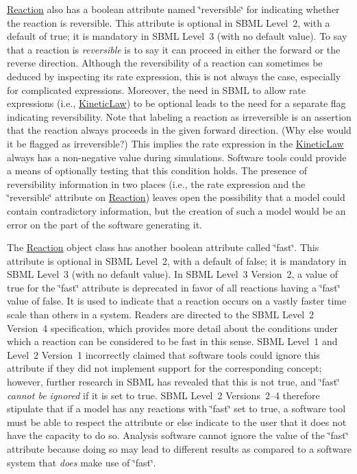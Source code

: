 \hyperlink{class_reaction}{Reaction} also has a boolean attribute named \char`\"{}reversible\char`\"{} for indicating whether the reaction is reversible. This attribute is optional in S\+B\+ML Level~2, with a default of {\ttfamily true}; it is mandatory in S\+B\+ML Level~3 (with no default value). To say that a reaction is {\itshape reversible} is to say it can proceed in either the forward or the reverse direction. Although the reversibility of a reaction can sometimes be deduced by inspecting its rate expression, this is not always the case, especially for complicated expressions. Moreover, the need in S\+B\+ML to allow rate expressions (i.\+e., \hyperlink{class_kinetic_law}{Kinetic\+Law}) to be optional leads to the need for a separate flag indicating reversibility. Note that labeling a reaction as irreversible is an assertion that the reaction always proceeds in the given forward direction. (Why else would it be flagged as irreversible?) This implies the rate expression in the \hyperlink{class_kinetic_law}{Kinetic\+Law} always has a non-\/negative value during simulations. Software tools could provide a means of optionally testing that this condition holds. The presence of reversibility information in two places (i.\+e., the rate expression and the \char`\"{}reversible\char`\"{} attribute on \hyperlink{class_reaction}{Reaction}) leaves open the possibility that a model could contain contradictory information, but the creation of such a model would be an error on the part of the software generating it.

The \hyperlink{class_reaction}{Reaction} object class has another boolean attribute called \char`\"{}fast\char`\"{}. This attribute is optional in S\+B\+ML Level~2, with a default of {\ttfamily false}; it is mandatory in S\+B\+ML Level~3 (with no default value). In S\+B\+ML Level~3 Version~2, a value of {\ttfamily true} for the \char`\"{}fast\char`\"{} attribute is deprecated in favor of all reactions having a \char`\"{}fast\char`\"{} value of {\ttfamily false}. It is used to indicate that a reaction occurs on a vastly faster time scale than others in a system. Readers are directed to the S\+B\+ML Level~2 Version~4 specification, which provides more detail about the conditions under which a reaction can be considered to be fast in this sense. S\+B\+ML Level~1 and Level~2 Version~1 incorrectly claimed that software tools could ignore this attribute if they did not implement support for the corresponding concept; however, further research in S\+B\+ML has revealed that this is not true, and \char`\"{}fast\char`\"{} {\itshape cannot be ignored} if it is set to {\ttfamily true}. S\+B\+ML Level~2 Versions~2--4 therefore stipulate that if a model has any reactions with \char`\"{}fast\char`\"{} set to {\ttfamily true}, a software tool must be able to respect the attribute or else indicate to the user that it does not have the capacity to do so. Analysis software cannot ignore the value of the \char`\"{}fast\char`\"{} attribute because doing so may lead to different results as compared to a software system that {\itshape does} make use of \char`\"{}fast\char`\"{}.

